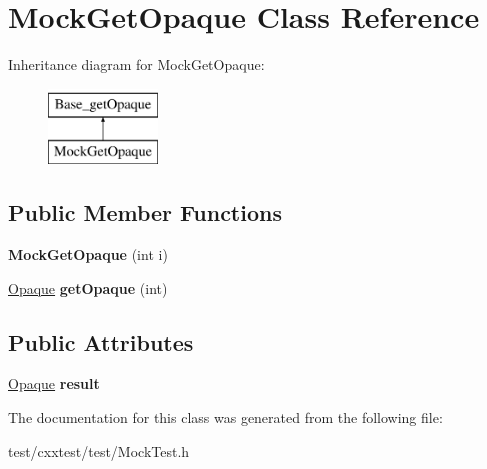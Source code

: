 \hypertarget{classMockGetOpaque}{\section{Mock\-Get\-Opaque Class Reference}
\label{classMockGetOpaque}
}
Inheritance diagram for Mock\-Get\-Opaque\-:\begin{figure}[H]
\begin{center}
\leavevmode
\includegraphics[height=2.000000cm]{classMockGetOpaque}
\end{center}
\end{figure}
\subsection*{Public Member Functions}
\begin{DoxyCompactItemize}
\item 
\hypertarget{classMockGetOpaque_a5800a66b8f951272803adf4e2a9fd836}{{\bfseries Mock\-Get\-Opaque} (int i)}\label{classMockGetOpaque_a5800a66b8f951272803adf4e2a9fd836}

\item 
\hypertarget{classMockGetOpaque_a684cf34fc18f8ee8a0e4a6a3ca47778e}{\hyperlink{classOpaque}{Opaque} {\bfseries get\-Opaque} (int)}\label{classMockGetOpaque_a684cf34fc18f8ee8a0e4a6a3ca47778e}

\end{DoxyCompactItemize}
\subsection*{Public Attributes}
\begin{DoxyCompactItemize}
\item 
\hypertarget{classMockGetOpaque_a631d944f66957c84db3cea3232e72eff}{\hyperlink{classOpaque}{Opaque} {\bfseries result}}\label{classMockGetOpaque_a631d944f66957c84db3cea3232e72eff}

\end{DoxyCompactItemize}


The documentation for this class was generated from the following file\-:\begin{DoxyCompactItemize}
\item 
test/cxxtest/test/Mock\-Test.\-h\end{DoxyCompactItemize}
